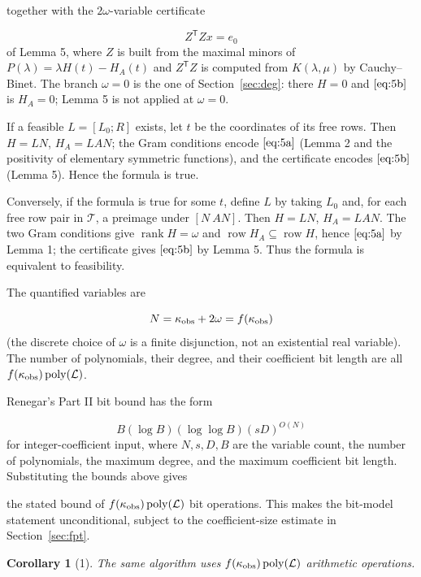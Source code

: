 \documentclass[journal]{IEEEtran}
\theoremstyle{plainn}
\newtheorem*{cor}{Corollary}
\begin{document}
together with the $2\omega$-variable certificate

\begin{equation}
Z^{\mathsf T}Zx=e_0
\end{equation}
of Lemma 5, where $Z$ is built from the maximal minors of $P(\lambda)=\lambda H(t)-H_A(t)$ and $Z^{\mathsf T}Z$ is computed from $K(\lambda,\mu)$ by Cauchy--Binet. The branch $\omega=0$ is the one of Section~\ref{sec:deg}: there $H=0$ and $\eqref{eq:5b}$ is $H_A=0$; Lemma 5 is not applied at $\omega=0$.

If a feasible $L=[L_0;R]$ exists, let $t$ be the coordinates of its free rows. Then $H=LN$, $H_A=LAN$; the Gram conditions encode $\eqref{eq:5a}$ (Lemma 2 and the positivity of elementary symmetric functions), and the certificate encodes $\eqref{eq:5b}$ (Lemma 5). Hence the formula is true.

Conversely, if the formula is true for some $t$, define $L$ by taking $L_0$ and, for each free row pair in $\mathcal T$, a preimage under $[N\ AN]$. Then $H=LN$, $H_A=LAN$. The two Gram conditions give $\operatorname{rank}H=\omega$ and $\operatorname{row}H_A\subseteq \operatorname{row}H$, hence $\eqref{eq:5a}$ by Lemma 1; the certificate gives $\eqref{eq:5b}$ by Lemma 5. Thus the formula is equivalent to feasibility.

The quantified variables are

\begin{equation}
N=\kappa_{\rm obs}+2\omega=f(\kappa_{\rm obs})
\end{equation}
(the discrete choice of $\omega$ is a finite disjunction, not an existential real variable). The number of polynomials, their degree, and their coefficient bit length are all $f(\kappa_{\rm obs})\operatorname{poly}(\mathcal L)$.

Renegar's Part II bit bound has the form

\begin{equation}
B(\log B)(\log\log B)(sD)^{O(N)}
\end{equation}
for integer-coefficient input, where $N,s,D,B$ are the variable count, the number of polynomials, the maximum degree, and the maximum coefficient bit length. Substituting the bounds above gives

the stated bound of $f(\kappa_{\rm obs})\operatorname{poly}(\mathcal L)$ bit operations. This makes the bit-model statement unconditional, subject to the coefficient-size estimate in Section~\ref{sec:fpt}.

\begin{cor}[1] The same algorithm uses $f(\kappa_{\rm obs})\operatorname{poly}(\mathcal L)$ arithmetic operations.
\end{cor}
\end{document}
